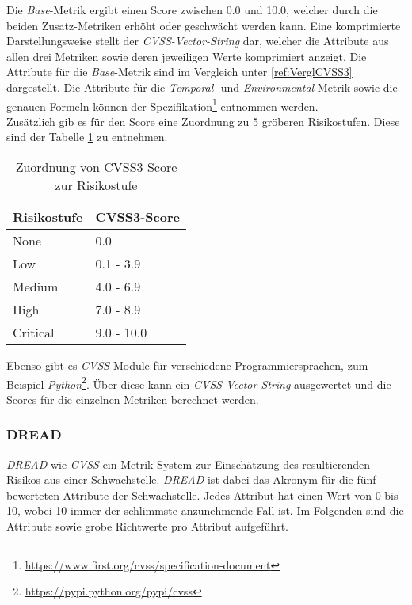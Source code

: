 			Die \textit{Base}-Metrik ergibt einen Score zwischen 0.0 und 10.0, welcher durch die beiden Zusatz-Metriken erhöht oder geschwächt werden kann. Eine komprimierte Darstellungsweise stellt der \textit{CVSS-Vector-String} dar, welcher die Attribute aus allen drei Metriken sowie deren jeweiligen Werte komprimiert anzeigt. Die Attribute für die \textit{Base}-Metrik sind im Vergleich unter \ref{ref:VerglCVSS3} dargestellt. Die Attribute für die \textit{Temporal}- und \textit{Environmental}-Metrik sowie die genauen Formeln können der Spezifikation\footnote{\url{https://www.first.org/cvss/specification-document}} entnommen werden.\cite{FIRSTCVSS}\\
		
		Zusätzlich gib es für den Score eine Zuordnung zu 5 gröberen Risikostufen. Diese sind der Tabelle \ref{tab:cvssToRisk} zu entnehmen.\\
		
		\begin{table}
			\centering
			\begin{tabularx}{5cm}{l | l}
				Risikostufe & CVSS3-Score \\\hline
				None & 0.0 \\
				Low & 0.1 - 3.9 \\
				Medium & 4.0 - 6.9 \\
				High & 7.0 - 8.9 \\
				Critical & 9.0 - 10.0	 \\
			\end{tabularx}
			\caption{Zuordnung von CVSS3-Score zur Risikostufe
			\label{tab:cvssToRisk}
 \cite{FIRSTCVSSSpec}}
		\end{table}
		
		Ebenso gibt es \textit{CVSS}-Module für verschiedene Programmiersprachen, zum Beispiel \textit{Python}\footnote{\url{https://pypi.python.org/pypi/cvss}}. Über diese kann ein\textit{ CVSS-Vector-String} ausgewertet und die Scores für die einzelnen Metriken berechnet werden.

		\subsubsection{DREAD}
		
		\textit{DREAD} wie \textit{CVSS} ein Metrik-System zur Einschätzung des resultierenden Risikos aus einer Schwachstelle. \textit{DREAD} ist dabei das Akronym für die fünf bewerteten Attribute der Schwachstelle. Jedes Attribut hat einen Wert von 0 bis 10, wobei 10 immer der schlimmste anzunehmende Fall ist. Im Folgenden sind die Attribute sowie grobe Richtwerte pro Attribut aufgeführt.\cite{DREADOWASP}
		
